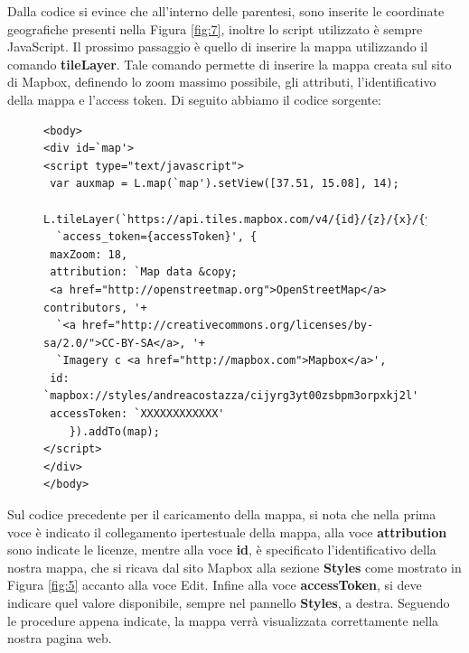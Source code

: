 \documentclass[a4paper,11pt]{article}
\begin{document}
Dalla codice si evince che all'interno delle parentesi, sono inserite le coordinate geografiche presenti nella Figura \ref{fig:7}, inoltre lo script utilizzato è sempre JavaScript.
Il prossimo passaggio è quello di inserire la mappa utilizzando il comando \textbf{tileLayer}. Tale comando permette di inserire la mappa creata sul sito di Mapbox, definendo lo zoom massimo possibile, gli attributi, l'identificativo della mappa e l'access token. Di seguito abbiamo il codice sorgente:
\begin{figure}[htb]
\begin{lstlisting}[style=htmlcssjs]
<body>		
<div id=`map'>
<script type="text/javascript">
 var auxmap = L.map(`map').setView([37.51, 15.08], 14);
 L.tileLayer(`https://api.tiles.mapbox.com/v4/{id}/{z}/{x}/{y}.png?'+ 
  `access_token={accessToken}', {
 maxZoom: 18,
 attribution: `Map data &copy; 
 <a href="http://openstreetmap.org">OpenStreetMap</a> contributors, '+
  `<a href="http://creativecommons.org/licenses/by-sa/2.0/">CC-BY-SA</a>, '+
  `Imagery c <a href="http://mapbox.com">Mapbox</a>',
 id: `mapbox://styles/andreacostazza/cijyrg3yt00zsbpm3orpxkj2l'
 accessToken: `XXXXXXXXXXXX'
	}).addTo(map);
</script>
</div>
</body>
\end{lstlisting}
\end{figure}
\newpage
Sul codice precedente per il caricamento della mappa, si nota che nella prima voce è indicato il collegamento ipertestuale della mappa, alla voce \textbf{attribution} sono indicate le licenze, mentre alla voce \textbf{id}, è specificato l'identificativo della nostra mappa, che si ricava dal sito Mapbox alla sezione \textbf{Styles} come mostrato in Figura \ref{fig:5} accanto alla voce Edit.
Infine alla voce \textbf{accessToken}, si deve indicare quel valore disponibile, sempre nel pannello \textbf{Styles}, a destra. \newline
Seguendo le procedure appena indicate, la mappa verrà visualizzata correttamente nella nostra pagina web.
\end{document}
